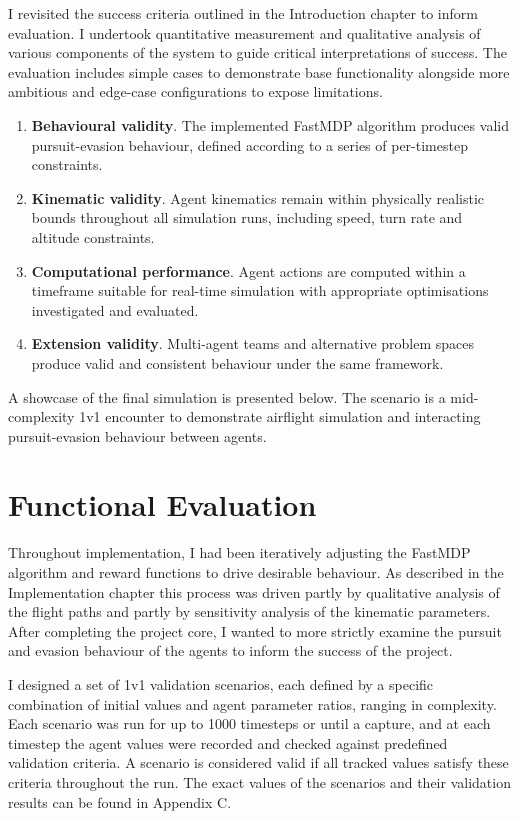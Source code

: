 \label{sec:4}
I revisited the success criteria outlined in the Introduction chapter to inform evaluation. I undertook quantitative measurement and qualitative analysis of various components of the system to guide critical interpretations of success. The evaluation includes  simple cases to demonstrate base functionality alongside more ambitious and edge-case configurations to expose limitations.

\begin{enumerate}
    \item \textbf{Behavioural validity}. The implemented FastMDP algorithm produces valid pursuit-evasion behaviour, defined according to a series of per-timestep constraints.
    \item \textbf{Kinematic validity}. Agent kinematics remain within physically realistic bounds throughout all simulation runs, including speed, turn rate and altitude constraints.
    \item \textbf{Computational performance}. Agent actions are computed within a timeframe suitable for real-time simulation with appropriate optimisations investigated and evaluated.
    \item \textbf{Extension validity}. Multi-agent teams and alternative problem spaces produce valid and consistent behaviour under the same framework.
\end{enumerate}

A showcase of the final simulation is presented below. The scenario is a mid-complexity 1v1 encounter to demonstrate airflight simulation and interacting pursuit-evasion behaviour between agents.


\section{Functional Evaluation}
\label{sec:4.1}
Throughout implementation, I had been iteratively adjusting the FastMDP algorithm and reward functions to drive desirable behaviour. As described in the Implementation chapter this process was driven partly by qualitative analysis of the flight paths and partly by sensitivity analysis of the kinematic parameters. 
After completing the project core, I wanted to more strictly examine the pursuit and evasion behaviour of the agents to inform the success of the project.

I designed a set of 1v1 validation scenarios, each defined by a specific combination of initial values and agent parameter ratios, ranging in complexity. Each scenario was run for up to 1000 timesteps or until a capture, and at each timestep the agent values were recorded and checked against predefined validation criteria. A scenario is considered valid if all tracked values satisfy these criteria throughout the run. The exact values of the scenarios and their validation results can be found in Appendix C. 

